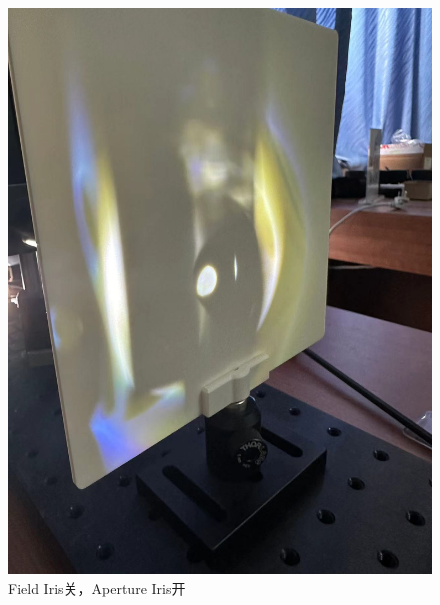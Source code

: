 \documentclass{ctexart}
\begin{document}
\begin{figure}[H]
\begin{minipage}[b]{0.2\textwidth}
    \includegraphics[width=\textwidth]{pictures/微信图片_20241010201018.jpg}
    \caption{Field Iris关，Aperture Iris开}
  \end{minipage}
  \hspace{0.05\textwidth} %
  \begin{minipage}[b]{0.2\textwidth}
    \centering

\end{minipage}
\end{figure}
\end{document}
